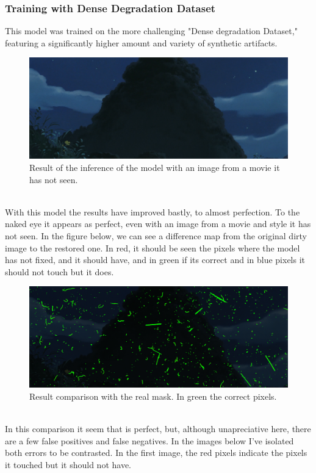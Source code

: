 \documentclass[openany, 12pt]{article}
\begin{document}
\subsubsection*{Training with Dense Degradation Dataset}
This model was trained on the more challenging "Dense degradation Dataset," featuring a significantly higher amount and variety of synthetic artifacts.
    	\begin{figure}[h!]
	\centering
	\includegraphics[width=0.8\linewidth]{./images/totoro_predicted.png}
	\caption{\smaller Result of the inference of the model with an image from a movie it has not seen.} 
\end{figure}
\\With this model the results have improved bastly, to almost perfection. To the naked eye it appears as perfect, even with an image from a movie and style it has not seen. 
\newpage
In the figure below, we can see a difference map from the original dirty image to the restored one. 
In red, it should be seen the pixels where the model has not fixed, and it should have, and in green if its correct and in blue pixels it should not touch but it does.
\begin{figure}[h!]
	\centering
	\includegraphics[width=0.8\linewidth]{./images/totoro_compare.png}
	\caption{\smaller Result comparison with the real mask. In green the correct pixels.} 
\end{figure}
\\In this comparison it seem that is perfect, but, although unapreciative here, there are a few false positives and false negatives. In the images below I've isolated both errors to be contrasted. In the first image, the red pixels indicate the pixels it touched but it should not have.
\end{document}
